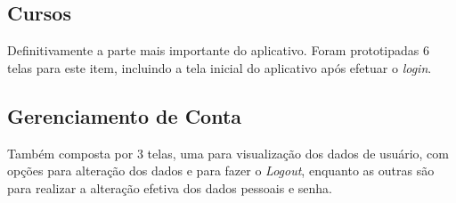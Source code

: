 \subsection{Cursos}

Definitivamente a parte mais importante do aplicativo. Foram prototipadas 6 telas para este item, incluindo a tela inicial do aplicativo após efetuar o \textit{login}.


\subsection{Gerenciamento de Conta}

Também composta por 3 telas, uma para visualização dos dados de usuário, com opções para alteração dos dados e para fazer o \textit{Logout}, enquanto as outras são para realizar a alteração efetiva dos dados pessoais e senha.

